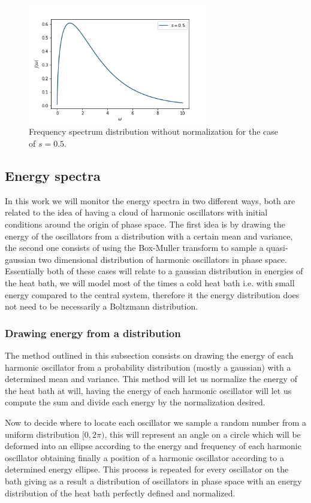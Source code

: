 \begin{figure}[H]
\centering
\includegraphics[width=0.7\textwidth]{Figures/frequency_spectra.png}
\caption{Frequency spectrum distribution without normalization for the case of $s=0.5$.
}
\label{fig:frequency_spectra}
\end{figure} 


\subsection{Energy spectra}
In this work we will monitor the energy spectra in two different ways, both are related to the idea of having a cloud of harmonic oscillators with initial conditions around the origin of phase space. The first idea is by  drawing the energy of the oscillators from a distribution with a certain mean and variance, the second one consists of using the Box-Muller transform to sample a quasi-gaussian two dimensional distribution of harmonic oscillators in phase space.  Essentially both of these cases will relate to a gaussian distribution in energies of the heat bath, we will model most of the times a cold heat bath i.e. with small energy compared to the central system, therefore it the energy distribution does not need to be necessarily a Boltzmann distribution.
\subsubsection{Drawing energy from a distribution}
The method outlined in this subsection consists on drawing the energy of each harmonic oscillator from a probability distribution (mostly a gaussian) with a determined mean and variance. This method will let us normalize the energy of the heat bath at will, having the energy of each harmonic oscillator will let us compute the sum and divide each energy by the normalization desired.\par 
Now to decide where to locate each oscillator we sample a random number from a uniform distribution $[0,2\pi)$, this will represent an angle on a circle which will be deformed into an ellipse according to the energy and frequency of each harmonic oscillator obtaining finally a position of a harmonic oscillator according to a determined energy ellipse. This process is repeated for every oscillator on the bath giving as a result a distribution of oscillators in phase space with an energy distribution of the heat bath perfectly defined and normalized.

